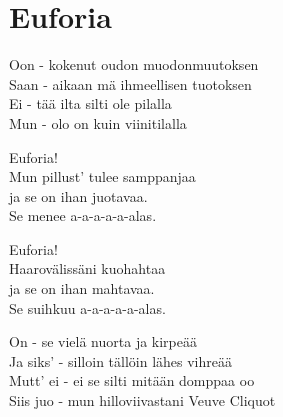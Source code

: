 \section{Euforia}
Oon - kokenut oudon muodonmuutoksen\\
Saan - aikaan mä ihmeellisen tuotoksen\\
Ei - tää ilta silti ole pilalla\\
Mun - olo on kuin viinitilalla

Euforia!\\
Mun pillust' tulee samppanjaa\\
ja se on ihan juotavaa.\\
Se menee a-a-a-a-a-alas.

Euforia!\\
Haarovälissäni kuohahtaa\\
ja se on ihan mahtavaa.\\
Se suihkuu a-a-a-a-a-alas.

On - se vielä nuorta ja kirpeää\\
Ja siks’ - silloin tällöin lähes vihreää\\
Mutt’ ei - ei se silti mitään domppaa oo\\
Siis juo - mun hilloviivastani Veuve Cliquot